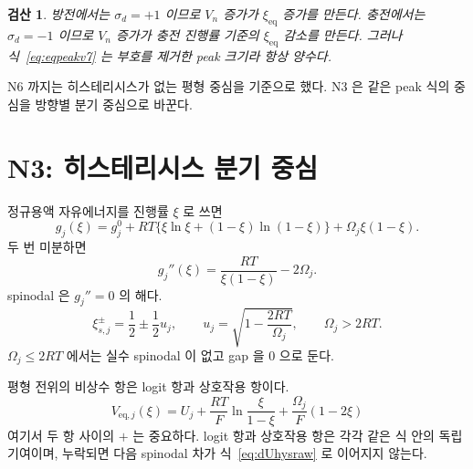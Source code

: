 \documentclass[11pt,a4paper]{article}
\newtheorem*{verifybox}{검산}
\newcommand{\eq}{\mathrm{eq}}
\begin{document}
\begin{verifybox}
방전에서는 $\sigma_d=+1$ 이므로 $V_n$ 증가가 $\xi_{\eq}$ 증가를 만든다. 충전에서는 $\sigma_d=-1$ 이므로 $V_n$ 증가가 충전 진행률 기준의 $\xi_{\eq}$ 감소를 만든다. 그러나 식~\eqref{eq:eqpeakv7} 는 부호를 제거한 peak 크기라 항상 양수다.
\end{verifybox}

N6 까지는 히스테리시스가 없는 평형 중심을 기준으로 했다. N3 은 같은 peak 식의 중심을 방향별 분기 중심으로 바꾼다.

\section{N3: 히스테리시스 분기 중심}\label{sec:n3}
정규용액 자유에너지를 진행률 $\xi$ 로 쓰면
\begin{equation}
g_j(\xi)=g_j^0+RT\{\xi\ln\xi+(1-\xi)\ln(1-\xi)\}+\Omega_j\xi(1-\xi).
\label{eq:gxi_v7}
\end{equation}
두 번 미분하면
\begin{equation}
g_j''(\xi)=\frac{RT}{\xi(1-\xi)}-2\Omega_j.
\label{eq:gpp_v7}
\end{equation}
spinodal 은 $g_j''=0$ 의 해다.
\begin{equation}
\xi_{s,j}^{\pm}=\frac12\pm\frac12u_j,\qquad
u_j=\sqrt{1-\frac{2RT}{\Omega_j}},\qquad \Omega_j>2RT.
\label{eq:spinodal_v7}
\end{equation}
$\Omega_j\le2RT$ 에서는 실수 spinodal 이 없고 gap 을 0 으로 둔다.

평형 전위의 비상수 항은 logit 항과 상호작용 항이다.
\begin{equation}
V_{\eq,j}(\xi)=U_j+\frac{RT}{F}\ln\frac{\xi}{1-\xi}
+\frac{\Omega_j}{F}(1-2\xi)
\label{eq:Veq_v7}
\end{equation}
여기서 두 항 사이의 $+$ 는 중요하다. logit 항과 상호작용 항은 각각 같은 식 안의 독립 기여이며, 누락되면 다음 spinodal 차가 식~\eqref{eq:dUhysraw} 로 이어지지 않는다.
\end{document}
